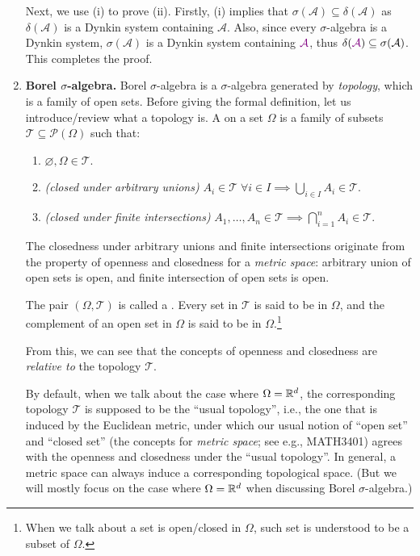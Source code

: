 \begin{enumerate}
\begin{pf}
Next, we use (i) to prove (ii).  Firstly, (i) implies that
\(\sigma(\mathcal{A})\subseteq \delta(\mathcal{A})\) as \(\delta(\mathcal{A})\)
is a Dynkin system containing \(\mathcal{A}\). Also, since every
\(\sigma\)-algebra is a Dynkin system, \(\sigma(\mathcal{A})\) is a Dynkin
system containing \(\vc{\mathcal{A}}\), thus \(\delta(\vc{\mathcal{A}})\subseteq
\sigma(\mathcal{A})\). This completes the proof.
\end{pf}
\item \textbf{Borel \(\sigma\)-algebra.} Borel \(\sigma\)-algebra is a
\(\sigma\)-algebra generated by \emph{topology}, which is a family of open
sets. Before giving the formal definition, let us introduce/review what a
topology is. A  on a set \(\Omega\) is a family of subsets
\(\mathcal{T}\subseteq \mathcal{P}(\Omega)\) such that:
\begin{enumerate}[label={(\arabic*)}]
\item \(\varnothing,\Omega\in\mathcal{T}\).
\item \emph{(closed under arbitrary unions)} \(A_i\in\mathcal{T}\;\forall i\in I\implies \bigcup_{i\in I}^{}A_i\in\mathcal{T}\).
\item \emph{(closed under finite intersections)} \(A_1,\dotsc,A_n\in\mathcal{T}\implies \bigcap_{i=1}^{n}A_i\in\mathcal{T}\).
\end{enumerate}
\begin{intuition}
The closedness under arbitrary unions and finite intersections originate from
the property of openness and closedness for a \emph{metric space}: arbitrary
union of open sets is open, and finite intersection of open sets is open.
\end{intuition}

The pair \((\Omega,\mathcal{T})\) is called a . Every
set in \(\mathcal{T}\) is said to be  in \(\Omega\), and the
complement of an open set in \(\Omega\) is said to be  in
\(\Omega\).\footnote{When we talk about a set is open/closed in \(\Omega\), such
set is understood to be a subset of \(\Omega\).}
\begin{note}
From this, we can see that the concepts of openness and closedness
are \emph{relative to} the topology \(\mathcal{T}\).
\end{note}

By default, when we talk about the case where \(\Omega=\mathbb{R}^d\), the
corresponding topology \(\mathcal{T}\) is supposed to be the ``usual
topology'', i.e., the one that is induced by the Euclidean metric, under which
our usual notion of ``open set'' and ``closed set'' (the concepts for
\emph{metric space}; see e.g., MATH3401) agrees with the openness and closedness
under the ``usual topology''. In general, a metric space can always induce a
corresponding topological space. (But we will mostly focus on the case
where \(\Omega=\mathbb{R}^d\) when discussing Borel \(\sigma\)-algebra.)


\end{enumerate}
